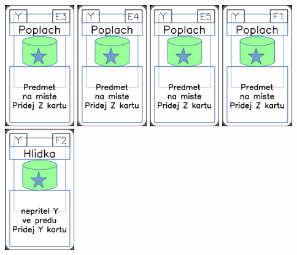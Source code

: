 \documentclass[a4paper]{article}
\begin{document}
	\includegraphics[width=3.0cm]{img-5_22}
	\includegraphics[width=3.0cm]{img-5_23}
	\includegraphics[width=3.0cm]{img-5_24}
	\includegraphics[width=3.0cm]{img-5_25}
	\includegraphics[width=3.0cm]{img-5_26}
\end{document}
